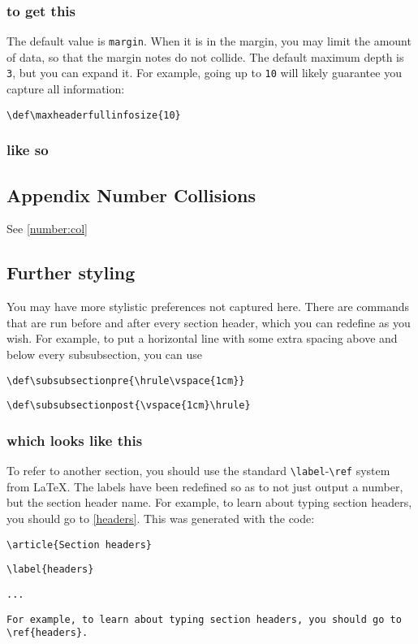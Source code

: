 \documentclass{constitution}
\begin{document}
\subsubsection{to get this}
The default value is \verb|margin|.
When it is in the margin, you may limit the amount of data, so that the margin notes do not collide.
The default maximum depth is \verb|3|, but you can expand it.
For example, going up to \verb|10| will likely guarantee you capture all information:\par
\quad \verb|\def\maxheaderfullinfosize{10}|
\def\maxheaderfullinfosize{10}
\def\headerfullinfoside{margin}
\subsubsection{like so}
\def\maxheaderfullinfosize{3}
\vspace{1.5cm}

\subsection{Appendix Number Collisions}
See \ref{number:col}

\subsection{Further styling}
You may have more stylistic preferences not captured here.
There are commands that are run before and after every section header, which you can redefine as you wish.
For example, to put a horizontal line with some extra spacing above and below every subsubsection, you can use\par
\quad \verb|\def\subsubsectionpre{\hrule\vspace{1cm}}|\par
\quad \verb|\def\subsubsectionpost{\vspace{1cm}\hrule}|\par
\def\subsubsectionpre{\hrule\vspace{1cm}}
\def\subsubsectionpost{\vspace{1cm}\hrule}
\subsubsection{which looks like this}
\def\subsubsectionpre{}
\def\subsubsectionpost{}

\label{number:col}
To refer to another section, you should use the standard \verb|\label|-\verb|\ref| system from LaTeX.
The labels have been redefined so as to not just output a number, but the section header name.
For example, to learn about typing section headers, you should go to \ref{headers}.
This was generated with the code:\par
\quad \verb|\article{Section headers}|\par
\quad \verb|\label{headers}|\par
\quad \verb|...|\par
\quad \verb|For example, to learn about typing section headers, you should go to \ref{headers}.|\par
\end{document}
